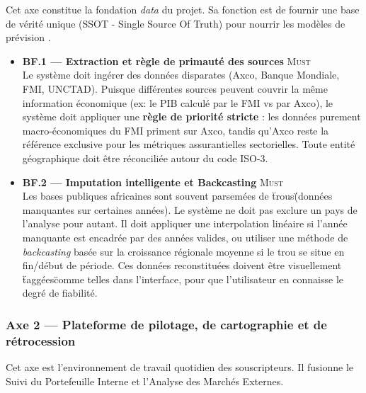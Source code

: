 \documentclass[12pt,a4paper]{report}
\begin{document}
Cet axe constitue la fondation \textit{data} du projet. Sa fonction est de fournir une base de vérité unique (SSOT - Single Source Of Truth) pour nourrir les modèles de prévision .

\begin{itemize}[leftmargin=1.5cm, itemsep=5pt]
  \item \textbf{BF.1 --- Extraction et règle de primauté des sources} \hfill \textsc{Must} \\ Le système doit ingérer des données disparates (Axco, Banque Mondiale, FMI, UNCTAD). Puisque différentes sources peuvent couvrir la même information économique (ex: le PIB calculé par le FMI vs par Axco), le système doit appliquer une \textbf{règle de priorité stricte} : les données purement macro-économiques du FMI priment sur Axco, tandis qu'Axco reste la référence exclusive pour les métriques assurantielles sectorielles. Toute entité géographique doit être réconciliée autour du code ISO-3.
  
  \item \textbf{BF.2 --- Imputation intelligente et Backcasting} \hfill \textsc{Must} \\ Les bases publiques africaines sont souvent parsemées de \"trous\" (données manquantes sur certaines années). Le système ne doit pas exclure un pays de l'analyse pour autant. Il doit appliquer une interpolation linéaire si l'année manquante est encadrée par des années valides, ou utiliser une méthode de \textit{backcasting} basée sur la croissance régionale moyenne si le trou se situe en fin/début de période. Ces données reconstituées doivent être visuellement \"taggées\" comme telles dans l'interface, pour que l'utilisateur en connaisse le degré de fiabilité.
\end{itemize}

\subsubsection{Axe 2 --- Plateforme de pilotage, de cartographie et de rétrocession}

Cet axe est l'environnement de travail quotidien des souscripteurs. Il fusionne le Suivi du Portefeuille Interne et l'Analyse des Marchés Externes.
\end{document}

